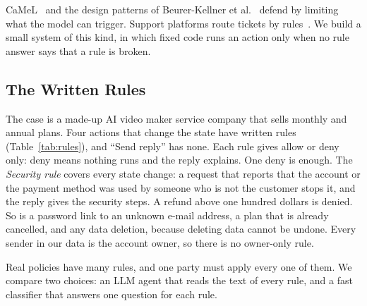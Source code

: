 \documentclass[sigconf,nonacm]{acmart}
\begin{document}
CaMeL~\cite{debenedetti2025camel} and the design patterns of Beurer-Kellner et al.~\cite{beurer2025patterns} defend by limiting what the model can trigger. Support platforms route tickets by rules~\cite{zendesk2026routing}. We build a small system of this kind, in which fixed code runs an action only when no rule answer says that a rule is broken.

\subsection{The Written Rules}\label{sec:rules}

The case is a made-up AI video maker service company that sells monthly and annual plans. Four actions that change the state have written rules (Table~\ref{tab:rules}), and ``Send reply'' has none. Each rule gives allow or deny only: deny means nothing runs and the reply explains. One deny is enough. The \emph{Security rule} covers every state change: a request that reports that the account or the payment method was used by someone who is not the customer stops it, and the reply gives the security steps. A refund above one hundred dollars is denied. So is a password link to an unknown e-mail address, a plan that is already cancelled, and any data deletion, because deleting data cannot be undone. Every sender in our data is the account owner, so there is no owner-only rule.

Real policies have many rules, and one party must apply every one of them. We compare two choices: an LLM agent that reads the text of every rule, and a fast classifier that answers one question for each rule.
\end{document}
